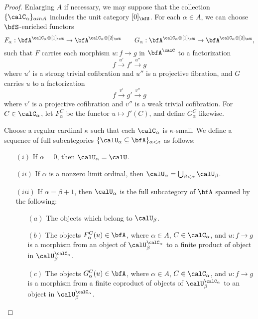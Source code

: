 \begin{Simplicial Categories}
\begin{proof}
Enlarging $A$ if necessary, we may suppose that the collection $\{ \calC_{\alpha} \}_{\alpha in A}$
includes the unit category $[0]_{\bfS}$. 
For each $\alpha \in A$, we can choose
$\bfS$-enriched functors $$F_{\alpha}: \bfA^{ \calC_{\alpha} \otimes [1]_{\bfS} } \rightarrow
\bfA^{ \calC_{\alpha} \otimes [2]_{\bfS} } \quad \quad
G_{\alpha}: \bfA^{ \calC_{\alpha} \otimes [1]_{\bfS} } \rightarrow
\bfA^{ \calC_{\alpha} \otimes [2]_{\bfS} },$$
such that $F$ carries each morphism $u: f \rightarrow g$ in $\bfA^{\calC}$ to a factorization
$$ f \stackrel{u'}{\rightarrow} f' \stackrel{u''}{\rightarrow} g$$
where $u'$ is a strong trivial cofibration and $u''$ is a projective fibration, and
$G$ carries $u$ to a factorization
$$ f \stackrel{v'}{\rightarrow} g' \stackrel{v''}{\rightarrow} g$$
where $v'$ is a projective cofibration and $v''$ is a weak trivial cofibration.
For $C \in \calC_{\alpha}$, let $F^{C}_{\alpha}$ be the
functor $u \mapsto f'(C)$, and define $G^{C}_{\alpha}$ likewise.

Choose a regular cardinal $\kappa$ such that each $\calC_{\alpha}$ is 
$\kappa$-small. We define a sequence of full subcategories
$\{ \calU_{\alpha} \subseteq \bfA \}_{ \alpha < \kappa }$ as follows:
\begin{itemize}
\item[$(i)$] If $\alpha = 0$, then $\calU_{\alpha} = \calU$.
\item[$(ii)$] If $\alpha$ is a nonzero limit ordinal, then 
$\calU_{\alpha} = \bigcup_{\beta < \alpha} \calU_{\beta}$.
\item[$(iii)$] If $\alpha = \beta + 1$, then
$\calU_{\alpha}$ is the full subcategory of $\bfA$ spanned by the following:
\begin{itemize}
\item[$(a)$] The objects which belong to $\calU_{\beta}$.
\item[$(b)$] The objects $F^{C}_{\alpha}(u) \in \bfA$, where
$\alpha \in A$, $C \in \calC_{\alpha}$, and $u: f \rightarrow g$
is a morphism from an object of $\calU_{\beta}^{\calC_{\alpha}}$ to
a finite product of object in $\calU_{\beta}^{\calC_{\alpha}}$. 
\item[$(c)$] The objects $G^{C}_{\alpha}(u) \in \bfA$, where
$\alpha \in A$, $C \in \calC_{\alpha}$, and $u: f \rightarrow g$
is a morphism from a finite coproduct of objects of $\calU_{\beta}^{\calC_{\alpha}}$ to
an object in $\calU_{\beta}^{\calC_{\alpha}}$. 
\end{itemize}
\end{itemize}


\end{proof}
\end{Simplicial Categories}
